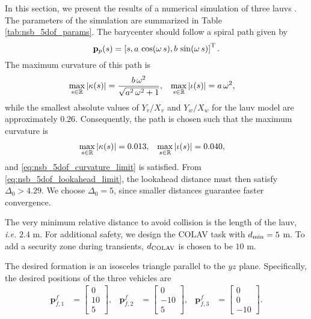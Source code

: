 In this section, we present the results of a numerical simulation of three \glspl{lauv} \cite{sousa_LAUV_2012}.
The parameters of the simulation are summarized in Table \ref{tab:nsb_5dof_params}.
The barycenter should follow a spiral path given by
\begin{equation}
    \mathbf{p}_p(s) = \left[s, a\,\cos(\omega\,s), b\,\sin(\omega\,s)\right]^{\mathrm{T}}.
\end{equation}
The maximum curvature of this path is
\begin{align}
    \max_{s \in \mathbb{R}} \left|\kappa(s)\right| &= \frac{b\,\omega ^2}{\sqrt{a^2\,\omega ^2+1}}, &
    \max_{s \in \mathbb{R}} \left|\iota(s)\right| &= a\,\omega ^2,
\end{align}
while the smallest absolute values of $Y_v / X_v$ and $Y_w / X_w$ for the \gls{lauv} model are approximately $0.26$.
Consequently, the path is chosen such that the maximum curvature is
\begin{align}
    \max_{s \in \mathbb{R}} \left|\kappa(s)\right| &= 0.013, &
    \max_{s \in \mathbb{R}} \left|\iota(s)\right| &= 0.040,
\end{align}
and \eqref{eq:nsb_5dof_curvature_limit} is satisfied.
From \eqref{eq:nsb_5dof_lookahead_limit}, the lookahead distance must then satisfy $\Delta_0 > 4.29$.
We choose $\Delta_0 = 5$, since smaller distances guarantee faster convergence.

The very minimum relative distance to avoid collision is the length of the \gls{lauv}, \emph{i.e.} $2.4$ m.
For additional safety, we design the COLAV task with $d_{\rm min} = 5$ m.
To add a security zone during transients, $d_{\rm COLAV}$ is chosen to be $10$ m.

The desired formation is an isosceles triangle parallel to the $yz$ plane.
Specifically, the desired positions of the three vehicles are
\begin{align}
    \mathbf{p}_{f,1}^f &= \begin{bmatrix} 0 \\ 10 \\ 5\end{bmatrix}, &
    \mathbf{p}_{f,2}^f &= \begin{bmatrix} 0 \\ -10 \\ 5\end{bmatrix}, &
    \mathbf{p}_{f,3}^f &= \begin{bmatrix} 0 \\ 0 \\ -10\end{bmatrix}.
\end{align}

